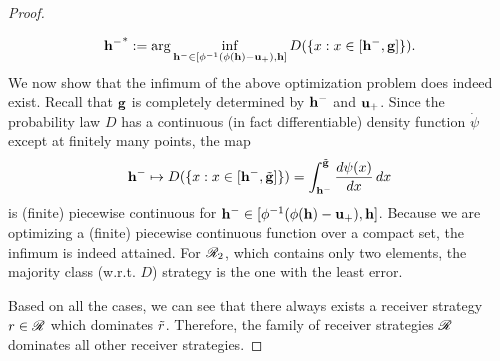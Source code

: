 \begin{proof}
\begin{apdxproof}
	\[
	\mathbf{h^{-}}^* := \arg\inf_{\mathbf{h^{-}} \in [\phi^{-1}(\phi(\mathbf{h}) - \mathbf{u_+}), \mathbf{h}]} D(\{x : x \in [\mathbf{h^{-}}, \mathbf{g}]\}).
	\]
	We now show that the infimum of the above optimization problem does indeed exist. Recall that $\mathbf{g}$ is completely determined by $\mathbf{h^{-}}$ and $\mathbf{u_+}$. Since the probability law $D$ has a continuous  (in fact differentiable) density function $\dot{\psi}$ except at finitely many points, the map
	\[
	\mathbf{h^{-}} \mapsto D(\{x : x \in [\mathbf{h^{-}}, \tilde{\mathbf{g}}]\}) = \int_{\mathbf{h^{-}}}^{\tilde{\mathbf{g}}} \frac{d\psi(x)}{dx}\, dx
	\]
	is (finite) piecewise continuous for $\mathbf{h^{-}} \in [\phi^{-1}(\phi(\mathbf{h}) - \mathbf{u_+}), \mathbf{h}]$. Because we are optimizing a (finite) piecewise continuous function over a compact set, the infimum is indeed attained.
	For $\mathscr{R}_2$, which contains only two elements, the majority class (w.r.t. $D$) strategy is the one with the least error.
\end{apdxproof}


\noindent Based on all the cases, we can see that there always exists a receiver strategy $r \in \mathscr{R}$ which dominates $\tilde{r}$. Therefore, the family of receiver strategies $\mathscr{R}$ dominates all other receiver strategies.
\end{proof}

